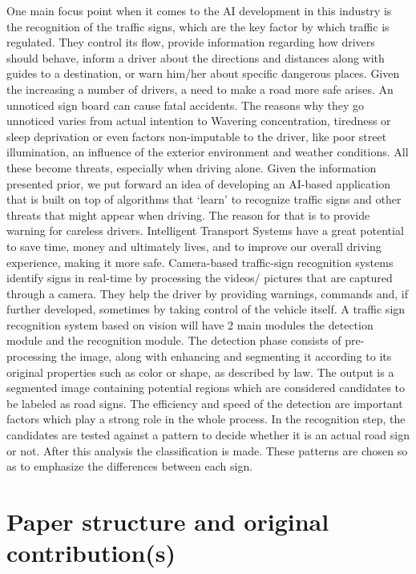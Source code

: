 \documentclass[runningheads,a4paper,11pt]{report}
\begin{document}
One main focus point when it comes to the AI development in this industry is the recognition of the traffic signs, which are the key factor by which traffic is regulated. They control its flow, provide information regarding how drivers should behave, inform a driver about the directions and distances along with guides to a destination, or warn him/her about specific dangerous places. Given the increasing a number of drivers, a need to make a road more safe arises. An unnoticed sign board can cause fatal accidents. The reasons why they go unnoticed varies from actual intention to Wavering concentration, tiredness or sleep deprivation or even factors non-imputable to the driver, like poor street illumination, an influence of the exterior environment and weather conditions. All these become threats, especially when driving alone. 
Given the information presented prior, we put forward an idea of developing an AI-based application that is built on top of algorithms that ‘learn’ to recognize traffic signs and other threats that might appear when driving. The reason for that is to provide warning for careless drivers. Intelligent Transport Systems have a great potential to save time, money and ultimately lives, and to improve our overall driving experience, making it more safe. Camera-based traffic-sign recognition systems identify signs in real-time by processing the videos/ pictures that are captured through a camera. They help the driver by providing warnings, commands and, if further developed, sometimes by taking control of the vehicle itself. A traffic sign recognition system based on vision will have 2 main modules  the detection module and the recognition module. The detection phase consists of pre-processing the image, along with enhancing and segmenting it according to its original properties such as color or shape, as described by law. The output is a segmented image containing potential regions which are considered candidates to be labeled as road signs. The efficiency and speed of the detection are important factors which play a strong role in the whole process. In the recognition step, the candidates are tested against a pattern to decide whether it is an actual road sign or not. After this analysis the classification is made. These patterns are chosen so as to emphasize the differences between each sign. 


\section{Paper structure and original contribution(s)}
\label{section:structure}
\end{document}
